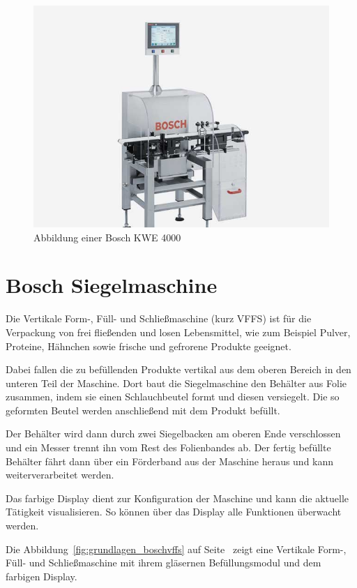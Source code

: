 \begin{figure}[h]
    \centering
    \includegraphics[scale=0.4]{images/kapitel_2/bosch_kwe.jpg}
    \caption{Abbildung einer Bosch KWE 4000}
    \label{fig:grundlagen_boschkwe}
\end{figure}

\section{Bosch Siegelmaschine}
Die Vertikale Form-, Füll- und Schließmaschine (kurz VFFS) ist für die Verpackung von  frei fließenden und losen
Lebensmittel, wie zum Beispiel Pulver, Proteine, Hähnchen sowie frische und gefrorene Produkte geeignet.

Dabei fallen die zu befüllenden Produkte vertikal aus dem oberen Bereich in den unteren Teil der Maschine. Dort baut
die Siegelmaschine den Behälter aus Folie zusammen, indem sie einen Schlauchbeutel formt und diesen versiegelt. Die
so geformten Beutel werden anschließend mit dem Produkt befüllt.

Der Behälter wird dann durch zwei Siegelbacken am oberen Ende verschlossen und ein Messer trennt ihn vom Rest des
Folienbandes ab. Der fertig befüllte Behälter fährt dann über ein Förderband aus der Maschine heraus und kann
weiterverarbeitet werden.

Das farbige Display dient zur Konfiguration der Maschine und kann die aktuelle Tätigkeit visualisieren. So können über
das Display alle Funktionen überwacht werden.

Die Abbildung~\ref{fig:grundlagen_boschvffs} auf Seite~\pageref{fig:grundlagen_boschvffs} zeigt eine Vertikale Form-,
Füll- und Schließmaschine mit ihrem gläsernen Befüllungsmodul und dem farbigen Display.

